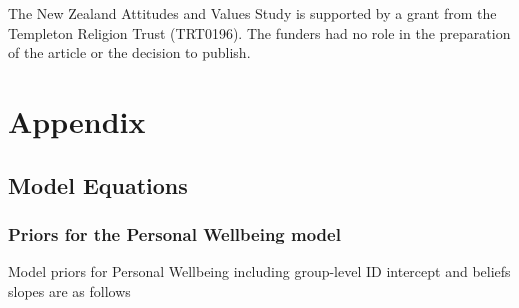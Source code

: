 \documentclass[
  english,
  man,floatsintext]{apa6}
\begin{document}
The New Zealand Attitudes and Values Study is supported by a grant from the Templeton Religion Trust (TRT0196). The funders had no role in the preparation of the article or the decision to publish.

\newpage

\hypertarget{appendix}{%
\section{Appendix}\label{appendix}}

\hypertarget{model-equations}{%
\subsection{Model Equations}\label{model-equations}}

\hypertarget{priors-for-the-personal-wellbeing-model}{%
\subsubsection{Priors for the Personal Wellbeing model}\label{priors-for-the-personal-wellbeing-model}}

Model priors for Personal Wellbeing including group-level ID intercept and beliefs slopes are as follows
\end{document}
